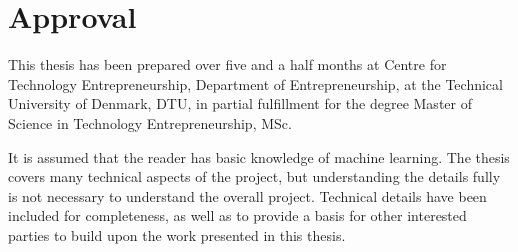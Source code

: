 \section*{Approval}
This thesis has been prepared over five and a half months at Centre for Technology Entrepreneurship, Department of Entrepreneurship, at the Technical University of Denmark, DTU, in partial fulfillment for the degree Master of Science in Technology Entrepreneurship, MSc.

It is assumed that the reader has basic knowledge of machine learning. The thesis covers many technical aspects of the project, but understanding the details fully is not necessary to understand the overall project. Technical details have been included for completeness, as well as to provide a basis for other interested parties to build upon the work presented in this thesis.

\vfill

\begin{center}
  \namesigdate{\thesisauthor~-~\studentnumber}
\end{center}

\vfill